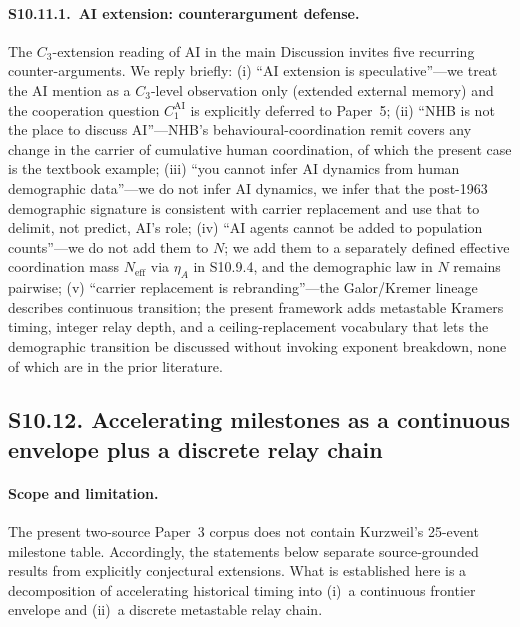 \documentclass[11pt]{article}
\begin{document}
\paragraph{S10.11.1.\ AI extension: counterargument defense.}
\label{subsec:S10_11_1_AI_counter_defense}
The $C_3$-extension reading of AI in the main Discussion invites five recurring counter-arguments.  We reply briefly: (i) ``AI extension is speculative''---we treat the AI mention as a $C_3$-level observation only (extended external memory) and the cooperation question $C_1^{\mathrm{AI}}$ is explicitly deferred to Paper~5; (ii) ``NHB is not the place to discuss AI''---NHB's behavioural-coordination remit covers any change in the carrier of cumulative human coordination, of which the present case is the textbook example; (iii) ``you cannot infer AI dynamics from human demographic data''---we do not infer AI dynamics, we infer that the post-1963 demographic signature is consistent with carrier replacement and use that to delimit, not predict, AI's role; (iv) ``AI agents cannot be added to population counts''---we do not add them to $N$; we add them to a separately defined effective coordination mass $N_{\mathrm{eff}}$ via $\eta_A$ in S10.9.4, and the demographic law in $N$ remains pairwise; (v) ``carrier replacement is rebranding''---the Galor/Kremer lineage describes continuous transition; the present framework adds metastable Kramers timing, integer relay depth, and a ceiling-replacement vocabulary that lets the demographic transition be discussed without invoking exponent breakdown, none of which are in the prior literature.

\subsection*{S10.12. Accelerating milestones as a continuous envelope plus a discrete relay chain}

\paragraph{Scope and limitation.}
The present two-source Paper~3 corpus does not contain Kurzweil's 25-event milestone table.
Accordingly, the statements below separate source-grounded results from explicitly conjectural extensions.
What is established here is a decomposition of accelerating historical timing into
(i)~a continuous frontier envelope and
(ii)~a discrete metastable relay chain.
\end{document}
